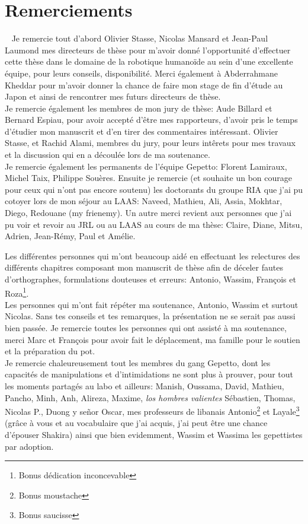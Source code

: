 \section*{Remerciements}
~\thispagestyle{empty}%
Je remercie tout d'abord Olivier Stasse, Nicolas Mansard et Jean-Paul Laumond
mes directeurs de thèse pour m'avoir donné l'opportunité d'effectuer cette thèse
dans le domaine de la robotique humanoïde au sein
d'une excellente équipe, pour leurs conseils, disponibilité.
Merci également à Abderrahmane Kheddar pour m'avoir donner la chance de 
faire mon stage de fin d'étude au Japon et ainsi de rencontrer mes futurs
directeurs de thèse.\\

Je remercie également les membres de mon jury de thèse:
Aude Billard et Bernard Espiau, pour avoir accepté d'être
mes rapporteurs, d'avoir pris le temps d'étudier mon manuscrit
et d'en tirer des commentaires intéressant. Olivier Stasse,
et Rachid Alami, membres du jury, pour leurs intêrets pour mes travaux
et la discussion qui en a découlée lors de ma soutenance.\\

Je remercie également les permanents de l'équipe Gepetto:
Florent Lamiraux, Michel Taix, Philippe Souères.
Ensuite je remercie (et souhaite un bon courage pour
ceux qui n'ont pas encore soutenu) les doctorants du groupe RIA que j'ai pu cotoyer
lors de mon séjour au LAAS: Naveed, Mathieu, Ali, Assia, Mokhtar, Diego, Redouane (my frienemy).
Un autre merci revient aux personnes que j'ai pu voir et revoir au JRL ou au LAAS au cours de ma thèse:
Claire, Diane, Mitsu, Adrien, Jean-Rémy, Paul et Amélie.

Les différentes personnes qui m'ont beaucoup aidé en effectuant
les relectures des différents chapitres composant mon manuscrit
de thèse afin de déceler fautes d'orthographes, formulations
douteuses et erreurs: Antonio, Wassim, François et 
Roza\footnote{Bonus dédication inconcevable}.\\

Les personnes qui m'ont fait répéter ma soutenance,
Antonio, Wassim et surtout Nicolas. Sans tes conseils et tes remarques,
la présentation ne se serait pas aussi bien passée.
Je remercie toutes les personnes qui ont assisté à ma soutenance, merci Marc et François pour avoir fait
le déplacement, ma famille pour le soutien et la préparation du pot.\\

Je remercie chaleureusement tout les membres du gang Gepetto, dont les capacités
de manipulations et d'intimidations ne sont plus à prouver,
pour tout les moments partagés au labo et ailleurs:
Manish, Oussama, David, Mathieu, Pancho, Minh, Anh, Alireza, Maxime, 
\emph{los hombres valientes} Sébastien, Thomas, Nicolas P., Duong y se\~nor Oscar, 
mes professeurs de libanais Antonio\footnote{Bonus moustache} et 
Layale\footnote{Bonus saucisse} (gr\^ace à vous et au vocabulaire que j'ai acquis, 
j'ai peut être une chance d'épouser Shakira)
ainsi que bien evidemment, Wassim et Wassima les gepettistes par adoption.\\

